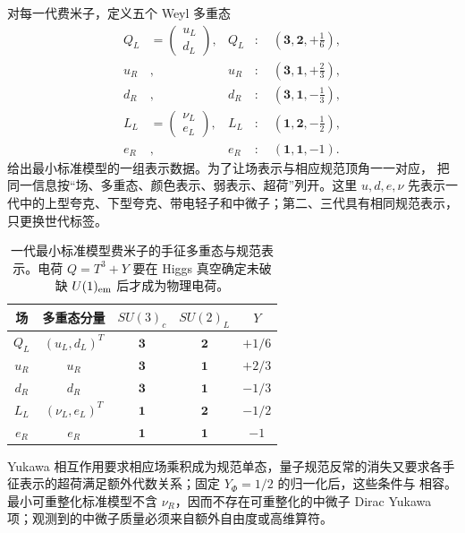 对每一代费米子，定义五个 Weyl 多重态
\begin{align}
 Q_L&=\begin{pmatrix}u_L\\ d_L\end{pmatrix},
 &Q_L&:\quad(\mathbf3,\mathbf2,+\tfrac16),\\
 u_R&,&u_R&:\quad(\mathbf3,\mathbf1,+\tfrac23),\\
 d_R&,&d_R&:\quad(\mathbf3,\mathbf1,-\tfrac13),\\
 L_L&=\begin{pmatrix}\nu_L\\ e_L\end{pmatrix},
 &L_L&:\quad(\mathbf1,\mathbf2,-\tfrac12),\\
 e_R&,&e_R&:\quad(\mathbf1,\mathbf1,-1).
 \label{eq:sm-one-generation-reps-dp11}
\end{align}
 给出最小标准模型的一组表示数据。为了让场表示与相应规范顶角一一对应， 把同一信息按“场、多重态、颜色表示、弱表示、超荷”列开。这里 $u,d,e,\nu$ 先表示一代中的上型夸克、下型夸克、带电轻子和中微子；第二、三代具有相同规范表示，只更换世代标签。

\begin{table}[htbp]
\centering
\caption{一代最小标准模型费米子的手征多重态与规范表示。电荷 $Q=T^3+Y$ 要在 Higgs 真空确定未破缺 $U(1)_{\rm em}$ 后才成为物理电荷。}
\label{tab:sm-one-generation-reps-dp115}
\begin{tabular}{c c c c c}
\toprule
场 & 多重态分量 & $SU(3)_c$ & $SU(2)_L$ & $Y$\\
\midrule
$Q_L$ & $(u_L,d_L)^T$ & $\mathbf3$ & $\mathbf2$ & $+1/6$\\
$u_R$ & $u_R$ & $\mathbf3$ & $\mathbf1$ & $+2/3$\\
$d_R$ & $d_R$ & $\mathbf3$ & $\mathbf1$ & $-1/3$\\
$L_L$ & $(\nu_L,e_L)^T$ & $\mathbf1$ & $\mathbf2$ & $-1/2$\\
$e_R$ & $e_R$ & $\mathbf1$ & $\mathbf1$ & $-1$\\
\bottomrule
\end{tabular}
\end{table}

Yukawa 相互作用要求相应场乘积成为规范单态，量子规范反常的消失又要求各手征表示的超荷满足额外代数关系；固定 $Y_\Phi=1/2$ 的归一化后，这些条件与 相容。最小可重整化标准模型不含 $\nu_R$，因而不存在可重整化的中微子 Dirac Yukawa 项；观测到的中微子质量必须来自额外自由度或高维算符。

